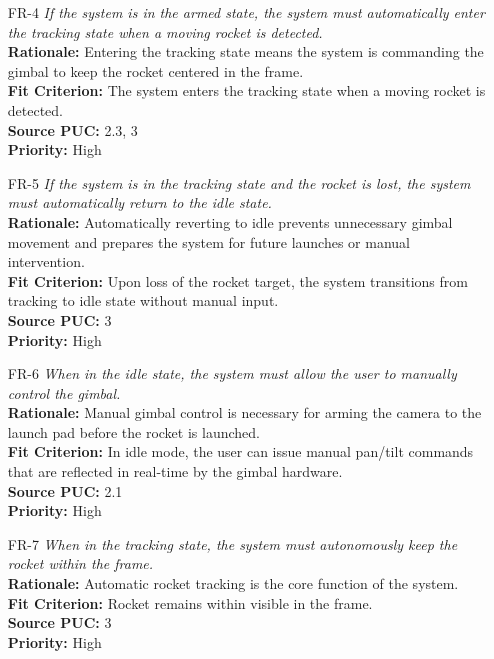 \documentclass[12pt]{article}
\begin{document}
\begin{itemize}[leftmargin=*]
  \item[FR-4] \emph{If the system is in the armed state, the system must automatically
          enter the tracking state when a moving rocket is detected.}\\[2mm]
        \textbf{Rationale:} Entering the tracking state means the system is commanding the gimbal to keep the rocket centered in the frame.\\
        \textbf{Fit Criterion:} The system enters the tracking state when a moving rocket is detected.\\
        \textbf{Source PUC:} 2.3, 3 \\
        \textbf{Priority:} High

  \item[FR-5] \emph{If the system is in the tracking state and the rocket is lost, the
          system must automatically return to the idle state.}\\[2mm]
        \textbf{Rationale:} Automatically reverting to idle prevents unnecessary gimbal movement and prepares the system for future launches or manual intervention.\\
        \textbf{Fit Criterion:} Upon loss of the rocket target, the system transitions from tracking to idle state without manual input.\\
        \textbf{Source PUC:} 3 \\
        \textbf{Priority:} High

  \item[FR-6] \emph{When in the idle state, the system must allow the user to manually
          control the gimbal.}\\[2mm]
        \textbf{Rationale:} Manual gimbal control is necessary for arming the camera to the launch pad before the rocket is launched.\\
        \textbf{Fit Criterion:} In idle mode, the user can issue manual pan/tilt commands that are reflected in real-time by the gimbal hardware.\\
        \textbf{Source PUC:} 2.1 \\
        \textbf{Priority:} High

  \item[FR-7] \emph{When in the tracking state, the system must autonomously keep the
          rocket within the frame.}\\[2mm]
        \textbf{Rationale:} Automatic rocket tracking is the core function of the system.\\
        \textbf{Fit Criterion:} Rocket remains within visible in the frame.\\
        \textbf{Source PUC:} 3 \\
        \textbf{Priority:} High


\end{itemize}
\end{document}
